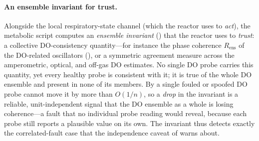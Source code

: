 \documentclass[11pt,a4paper,twocolumn]{article}
\theoremstyle{thmstyle}
\theoremstyle{definition}
\theoremstyle{remark}
\newcommand{\Rens}{R_{\mathrm{ens}}}
\begin{document}
\paragraph{An ensemble invariant for trust.}
Alongside the local respiratory-state channel (which the reactor uses to
\emph{act}), the metabolic script computes an \emph{ensemble invariant}
() that the reactor uses to \emph{trust}: a
collective DO-consistency quantity---for instance the phase coherence
$\Rens$ of the DO-related oscillators (), or a
symmetric agreement measure across the amperometric, optical, and off-gas
DO estimates. No single DO probe carries this quantity, yet every healthy
probe is consistent with it; it is true of the whole DO ensemble and
present in none of its members. By  a single
fouled or spoofed DO probe cannot move it by more than $O(1/n)$, so a
\emph{drop} in the invariant is a reliable, unit-independent signal that
the DO ensemble as a whole is losing coherence---a fault that no
individual probe reading would reveal, because each probe still reports a
plausible value on its own. The invariant thus detects exactly the
correlated-fault case that the independence caveat of
 warns about.
\end{document}
